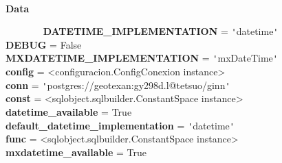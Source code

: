 ~\\
{\bf Data}
    
{\tt ~~~~~~}~
{\bf DATETIME\_IMPLEMENTATION} = \verb|'|datetime\verb|'|\\
{\bf DEBUG} = False\\
{\bf MXDATETIME\_IMPLEMENTATION} = \verb|'|mxDateTime\verb|'|\\
{\bf config} = <configuracion.ConfigConexion instance>\\
{\bf conn} = \verb|'|postgres://geotexan:gy298d.l@tetsuo/ginn\verb|'|\\
{\bf const} = <sqlobject.sqlbuilder.ConstantSpace instance>\\
{\bf datetime\_available} = True\\
{\bf default\_datetime\_implementation} = \verb|'|datetime\verb|'|\\
{\bf func} = <sqlobject.sqlbuilder.ConstantSpace instance>\\
{\bf mxdatetime\_available} = True

